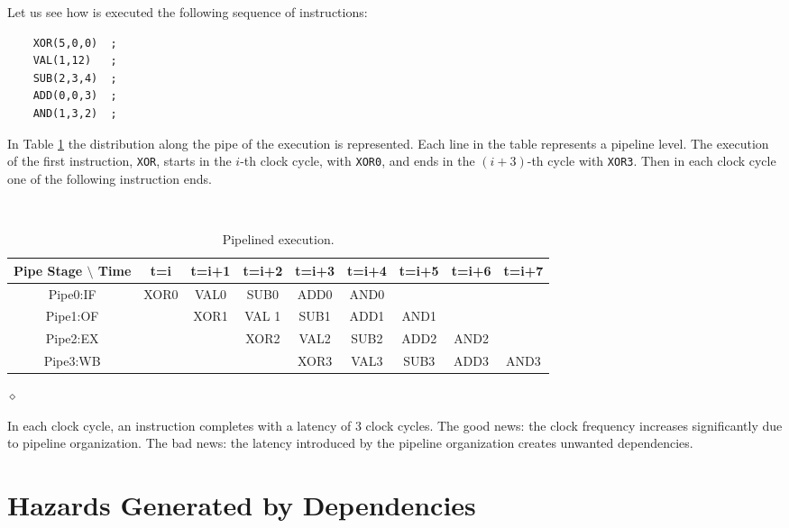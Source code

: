\begin{exemplu}
Let us see how is executed the following sequence of instructions:
\begin{verbatim}
    XOR(5,0,0)  ;
    VAL(1,12)   ;
    SUB(2,3,4)  ;
    ADD(0,0,3)  ;
    AND(1,3,2)  ;
\end{verbatim}
In Table \ref{pipeEx} the distribution along the pipe of the execution is represented. Each line in the table represents a pipeline level. The execution of the first instruction, {\tt XOR}, starts in the $i$-th clock cycle, with {\tt XOR0}, and ends in the $(i+3)$-th cycle with {\tt XOR3}. Then in each clock cycle one of the following instruction ends.

\begin{table}[H]
  \begin{center}
    \caption{Pipelined execution.}
    \label{pipeEx}
    {\small
    {\tt
    \begin{tabular}{|c||c|c|c|c|c|c|c|c|}
      \hline
     Pipe Stage $\setminus$ Time    & t=i & t=i+1 & t=i+2 & t=i+3 & t=i+4 & t=i+5 & t=i+6 & t=i+7   \\ \hline \hline
        Pipe0:IF        & XOR0 & VAL0   & SUB0   & ADD0   & AND0   &      &       &         \\ \hline
        Pipe1:OF        &     & XOR1   & VAL 1  & SUB1   & ADD1   & AND1   &          &         \\ \hline
        Pipe2:EX        &     &       & XOR2   & VAL2   & SUB2   & ADD2   & AND2   &        \\ \hline
        Pipe3:WB        &     &       &       & XOR3   & VAL3   & SUB3   & ADD3   & AND3        \\ \hline
    \end{tabular}
    }
    }
  \end{center}
\end{table}
$\diamond$
\end{exemplu}

In each clock cycle, an instruction completes with a latency of 3 clock cycles. The good news: the clock frequency increases significantly due to pipeline organization. The bad news: the latency introduced by the pipeline organization creates unwanted dependencies.

\section{Hazards Generated by Dependencies}


